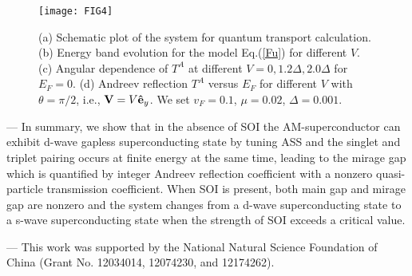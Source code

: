 \documentclass[aps, prb, twocolumn, amssymb, amsmath, showpacs, superscriptaddress]{revtex4-1}
\begin{document}
\begin{figure}[ht!]
\centering
\texttt{[image: FIG4]}
\caption{
\label{FIG4}
(a) Schematic plot of the system for quantum transport calculation.  (b) Energy band evolution for the model Eq.(\ref{Fu}) for different $V$. (c) Angular dependence of $T^A$ at different $V=0, 1.2\Delta, 2.0\Delta$ for $E_F=0$.
(d) Andreev reflection $T^A$ versus $E_F$ for different $V$ with $\theta=\pi/2$, i.e., ${\bf V}= V {\bf {\hat e}}_y$. We set $v_F=0.1$, $\mu=0.02$, $\Delta=0.001$.
}
\end{figure}


 --- In summary, we show that in the absence of SOI the AM-superconductor can exhibit d-wave gapless superconducting state by tuning ASS and the singlet and triplet pairing occurs at finite energy at the same time, leading to the mirage gap which is quantified by integer Andreev reflection coefficient with a nonzero quasi-particle transmission coefficient. When SOI is present, both main gap and mirage gap are nonzero and the system changes from a d-wave superconducting state to a  s-wave superconducting state when the strength of SOI exceeds a critical value.

\bigskip

 ---
This work was supported by the National Natural Science Foundation of China (Grant No. 12034014, 12074230, and 12174262).
\end{document}
